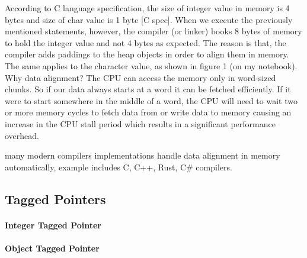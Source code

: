 According to C language specification, the size of integer value in memory is 4 bytes and size of char value is 1 byte [C spec]. When we execute the previously mentioned statements, however, the compiler (or linker) books 8 bytes of memory to hold the integer value and not 4 bytes as expected. The reason is that, the compiler adds paddings to the heap objects in order to align them in memory. The same applies to the character value, as shown in figure 1 (on my notebook). 
\\

Why data alignment? The CPU can access the memory only in word-sized chunks. So if our data always starts at a word it can be fetched efficiently. If it were to start somewhere in the middle of a word, the CPU will need to wait two or more memory cycles to fetch data from or write data to memory causing an increase in the CPU stall period which results in a significant performance overhead. 


many modern compilers implementations handle data alignment in memory automatically, example includes C, C++, Rust, C# compilers.

\subsection{Tagged Pointers}

\paragraph{Integer Tagged Pointer}

\paragraph{Object Tagged Pointer}
